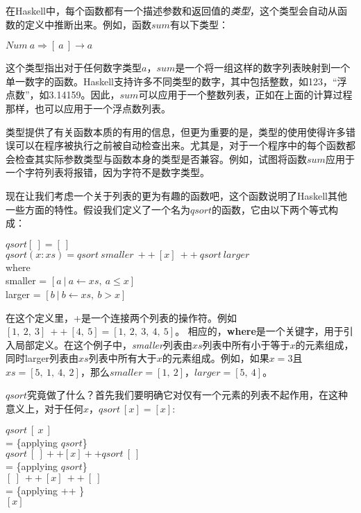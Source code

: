 在Haskell中，每个函数都有一个描述参数和返回值的\textit{类型}，这个类型会自动从函数的定义中推断出来。例如，函数$sum$有以下类型：

\noindent\hspace*{1cm} $Num ~a \Rightarrow [~a~] \rightarrow a$

这个类型指出对于任何数字类型$a$，$sum$是一个将一组这样的数字列表映射到一个单一数字的函数。Haskell支持许多不同类型的数字，其中包括整数，如123，“浮点数”，如3.14159。因此，$sum$可以应用于一个整数列表，正如在上面的计算过程那样，也可以应用于一个浮点数列表。

类型提供了有关函数本质的有用的信息，但更为重要的是，类型的使用使得许多错误可以在程序被执行之前被自动检查出来。尤其是，对于一个程序中的每个函数都会检查其实际参数类型与函数本身的类型是否兼容。例如，试图将函数$sum$应用于一个字符列表将报错，因为字符不是数字类型。

现在让我们考虑一个关于列表的更为有趣的函数吧，这个函数说明了Haskell其他一些方面的特性。假设我们定义了一个名为$qsort$的函数，它由以下两个等式构成：

\hspace*{1cm} $qsort [~] = [~]$\\
\hspace*{1cm} $qsort (x : xs) = qsort~smaller~++~[x]~++~qsort~larger$\\
\hspace*{3cm}                  where\\
\hspace*{4cm}                     smaller = $[a~|~a \leftarrow xs,~a ≤ x ]$\\
\hspace*{4cm}                     larger = $[b~|~b \leftarrow xs,~b > x ]$

在这个定义里，+是一个连接两个列表的操作符。例如$[1,~2,~3]~++~[4,~5] =
[1,~2,~3,~4,~5]$。
相应的，\textbf{where}是一个关键字，用于引入局部定义。在这个例子中，\textit{smaller}列表由$xs$列表中所有小于等于$x$的元素组成，同时larger列表由$xs$列表中所有大于$x$的元素组成。例如，如果$x
= 3$且$xs = [ 5,~1,~4,~2]$，那么$smaller = [1,~2]$，$larger = [5,~4]$。

$qsort$究竟做了什么？首先我们要明确它对仅有一个元素的列表不起作用，在这种意义上，对于任何$x$，$qsort~[x] = [x]$:

\noindent\hspace*{1cm} $qsort~[~x~]$\\
\hspace*{1cm} = \{applying $qsort$\}\\
\hspace*{1cm} $qsort~[~] ++ [x] ++ qsort~[~]$\\
\hspace*{1cm} = \{applying $qsort$\}\\
\hspace*{1cm} $[~]~++~[x]~++~[~]$\\
\hspace*{1cm} = \{applying ++ \}\\
\hspace*{1cm} $[x]$

